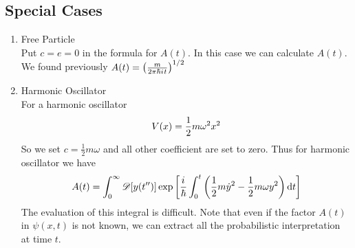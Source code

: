 	\subsection{Special Cases}
	\begin{enumerate}
		\item Free Particle\\
			Put $c=e=0$ in the formula for $A(t)$. In this case we can calculate $A(t)$. We found previously $A(t) = \qty(\frac{m}{2\pi \hbar {i\mkern1mu} t})^{1/2}$
			
		\item Harmonic Oscillator \\
			For a harmonic oscillator
			\begin{equation}
				V\qty(x) = \frac{1}{2} m \omega^2 x^2
			\end{equation}
			So we set $c=\frac{1}{2} m \omega$ and all other coefficient are set to zero. Thus for harmonic oscillator we have
			\begin{equation}
				A(t) = \int_{0}^{\infty} \mathcal{D}\qty[y\qty(t^{\prime\prime})]  \exp\qty[\frac{{i\mkern1mu}}{\hbar} \int_{0}^{t} \qty(\frac{1}{2} m \dot{y}^2 - \frac{1}{2} m \omega y^2  ) \dd{t}]
			\end{equation}
			The evaluation of this integral is difficult.
			Note that even if the factor $A(t)$ in $\psi(x, t)$ is not known, we can extract all the probabilistic interpretation at time $t$.
		
		
	\end{enumerate}
		
		